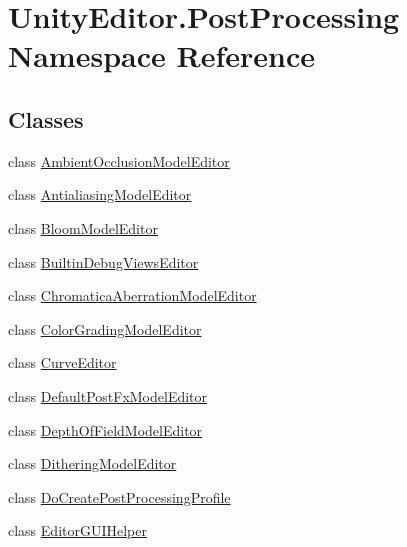 \hypertarget{namespace_unity_editor_1_1_post_processing}{}\section{Unity\+Editor.\+Post\+Processing Namespace Reference}
\label{namespace_unity_editor_1_1_post_processing}
\subsection*{Classes}
\begin{DoxyCompactItemize}
\item 
class \hyperlink{class_unity_editor_1_1_post_processing_1_1_ambient_occlusion_model_editor}{Ambient\+Occlusion\+Model\+Editor}
\item 
class \hyperlink{class_unity_editor_1_1_post_processing_1_1_antialiasing_model_editor}{Antialiasing\+Model\+Editor}
\item 
class \hyperlink{class_unity_editor_1_1_post_processing_1_1_bloom_model_editor}{Bloom\+Model\+Editor}
\item 
class \hyperlink{class_unity_editor_1_1_post_processing_1_1_builtin_debug_views_editor}{Builtin\+Debug\+Views\+Editor}
\item 
class \hyperlink{class_unity_editor_1_1_post_processing_1_1_chromatica_aberration_model_editor}{Chromatica\+Aberration\+Model\+Editor}
\item 
class \hyperlink{class_unity_editor_1_1_post_processing_1_1_color_grading_model_editor}{Color\+Grading\+Model\+Editor}
\item 
class \hyperlink{class_unity_editor_1_1_post_processing_1_1_curve_editor}{Curve\+Editor}
\item 
class \hyperlink{class_unity_editor_1_1_post_processing_1_1_default_post_fx_model_editor}{Default\+Post\+Fx\+Model\+Editor}
\item 
class \hyperlink{class_unity_editor_1_1_post_processing_1_1_depth_of_field_model_editor}{Depth\+Of\+Field\+Model\+Editor}
\item 
class \hyperlink{class_unity_editor_1_1_post_processing_1_1_dithering_model_editor}{Dithering\+Model\+Editor}
\item 
class \hyperlink{class_unity_editor_1_1_post_processing_1_1_do_create_post_processing_profile}{Do\+Create\+Post\+Processing\+Profile}
\item 
class \hyperlink{class_unity_editor_1_1_post_processing_1_1_editor_g_u_i_helper}{Editor\+G\+U\+I\+Helper}

\end{DoxyCompactItemize}

